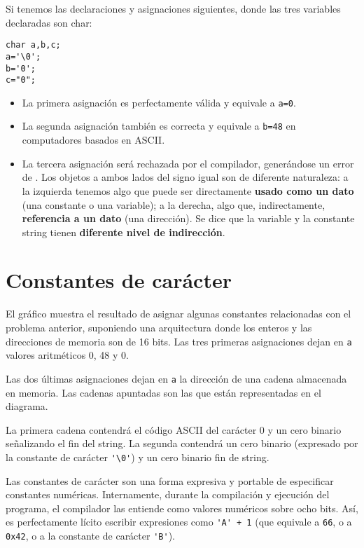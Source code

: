 Si tenemos las declaraciones y asignaciones siguientes, donde las tres variables declaradas son char:
\begin{lstlisting}
char a,b,c;
a='\0';
b='0';
c="0";
\end{lstlisting}


\begin{itemize}
	\item La primera asignación es perfectamente válida y equivale a \lstinline{a=0}. 
	\item La segunda asignación también es correcta y equivale a \lstinline{b=48} en computadores basados en ASCII. 
 	\item La tercera asignación será rechazada por el compilador, generándose un error de . Los objetos a ambos lados del signo igual son de diferente naturaleza: a la izquierda tenemos algo que puede ser directamente \textbf{usado como un dato} (una constante o una variable); a la derecha, algo que, indirectamente, \textbf{referencia a un dato} (una dirección). Se dice que la variable y la constante string tienen \textbf{diferente nivel de indirección}.
\end{itemize}

\section{Constantes de carácter}
El gráfico muestra el resultado de asignar algunas constantes relacionadas con el problema anterior, suponiendo una arquitectura donde los enteros y las direcciones de memoria son de 16 bits. Las tres primeras asignaciones dejan en \lstinline{a} valores
aritméticos 0, 48 y 0.

Las dos últimas asignaciones dejan en \texttt{a} la dirección de una cadena almacenada en memoria. Las cadenas apuntadas son las que están representadas en el diagrama. 

La primera cadena contendrá el código ASCII del carácter 0 y un cero binario señalizando el fin del string. La
segunda contendrá un cero binario (expresado por la constante de carácter \lstinline{'\0'}) y un cero binario fin de string.

Las constantes de carácter son una forma expresiva y portable de especificar constantes numéricas.
Internamente, durante la compilación y ejecución del programa, el compilador las entiende como
valores numéricos sobre ocho bits. Así, es perfectamente lícito escribir expresiones como \lstinline{'A' + 1} (que
equivale a \lstinline{66}, o a \lstinline{0x42}, o a la constante de carácter \lstinline{'B'}).

